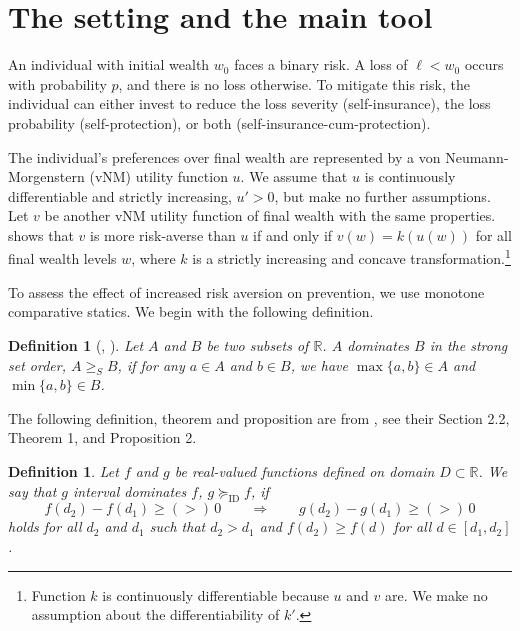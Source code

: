 \documentclass[11pt]{article}
\newtheorem{defi}[theorem]{Definition}
\begin{document}
\section{The setting and the main tool}

An individual with initial wealth $w_0$ faces a binary risk. A loss of $\ell <w_0$ occurs with probability $p$, and there is no loss otherwise. To mitigate this risk, the individual can either invest to reduce the loss severity (self-insurance), the loss probability (self-protection), or both (self-insurance-cum-protection).

The individual's preferences over final wealth are represented by a von Neumann-Morgenstern (vNM) utility function $u$. We assume that $u$ is continuously differentiable and strictly increasing, $u'>0$, but make no further assumptions. Let $v$ be another vNM utility function of final wealth with the same properties. \cite{pratt1964risk} shows that $v$ is more risk-averse than $u$ if and only if $v(w)=k(u(w))$ for all final wealth levels $w$, where $k$ is a strictly increasing and concave transformation.\footnote{Function $k$ is continuously differentiable because $u$ and $v$ are. We make no assumption about the differentiability of $k'$.} 

To assess the effect of increased risk aversion on prevention, we use monotone comparative statics. We begin with the following definition.

\begin{defi}[\citeauthor{topkis1998supermodularity}, \citeyear{topkis1998supermodularity}]
	Let $A$ and $B$ be two subsets of $\mathbb{R}$. $A$ dominates $B$ in the strong set order, $A \geq_S B$, if for any $a \in A$ and $b \in B$, we have $\max\{a,b\} \in A$ and $\min\{a,b\} \in B$. 
\end{defi}

The following definition, theorem and proposition are from \cite{quah2009comparative}, see their Section 2.2, Theorem 1, and Proposition 2.

\begin{defi}
	Let $f$ and $g$ be real-valued functions defined on domain $D \subset \mathbb{R}$. We say that $g$ interval dominates $f$, $g \succeq_{\text{ID}} f$, if
	\begin{equation}\label{eq:mon_cond}
		f(d_2) - f(d_1) \geq (>)\, 0 \qquad \Rightarrow \qquad g(d_2) - g(d_1) \geq (>)\, 0
	\end{equation}
	holds for all $d_2$ and $d_1$ such that $d_2 > d_1$ and $f(d_2) \geq f(d)$ for all $d \in [d_1,d_2]$.
\end{defi}
\end{document}
